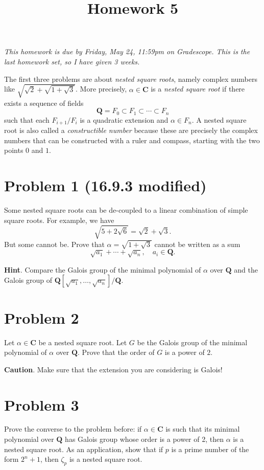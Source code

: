 \documentclass{amsart}
\date{}
\title{Homework 5}
\begin{document}
\maketitle
\emph{This homework is due by Friday, May 24, 11:59pm on Gradescope.  This is the last homework set, so I have given 3 weeks.}
\bigskip

The first three problems are about \emph{nested square roots}, namely complex numbers like \(\sqrt{\sqrt 2 + \sqrt{1 + \sqrt 3}}\).
More precisely, \(\alpha \in \mathbf{C}\) is a \emph{nested square root} if there exists a sequence of fields
\[ \mathbf{Q} = F_0 \subset F_1 \subset \cdots \subset F_n\]
such that each \(F_{i+1}/F_{i}\) is a quadratic extension and \(\alpha \in F_{n}\).
A nested square root is also called a \emph{constructible number} because these are precisely the complex numbers that can be constructed with a ruler and compass, starting with the two points \(0\) and \(1\).
\section{Problem 1  (16.9.3 modified)}
\label{sec:org9b5a832}

Some nested square roots can be de-coupled to a linear combination of simple square roots.
For example, we have
\[ \sqrt {5 + 2\sqrt 6} = \sqrt 2 + \sqrt 3.\]
But some cannot be.
Prove that \(\alpha = \sqrt{1 + \sqrt 3}\) cannot be written as a sum
\[ \sqrt{a_{1}} + \cdots + \sqrt{a_{n}}, \quad a_i \in \mathbf{Q}.\]

\textbf{Hint}. Compare the Galois group of the minimal polynomial of \(\alpha\) over \(\mathbf{Q}\) and the Galois group of \(\mathbf{Q}[\sqrt{a_1}, \dots, \sqrt{a_n}] / \mathbf{Q}.\)
\section{Problem 2}
\label{sec:orge482ce8}

Let \(\alpha \in \mathbf{C}\) be a nested square root.
Let \(G\) be the Galois group of the minimal polynomial of \(\alpha\) over \(\mathbf{Q}\).
Prove that the order of \(G\) is a power of \(2\).

\textbf{Caution}. Make sure that the extension you are considering is Galois!
\section{Problem 3}
\label{sec:orgee7cb2e}

Prove the converse to the problem before: if \(\alpha \in \mathbf{C}\) is such that its minimal polynomial over \(\mathbf{Q}\) has Galois group whose order is a power of 2, then \(\alpha\) is a nested square root.
As an application, show that if \(p\) is a prime number of the form \(2^n+1\), then \(\zeta_p\) is a nested square root.
\end{document}
